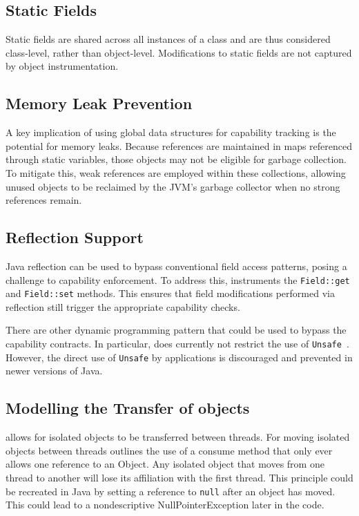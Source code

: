 \subsection{Static Fields}
Static fields are shared across all instances of a class and are thus considered class-level, rather than object-level. Modifications to static fields are not captured by \jdala object instrumentation. 

\subsection{Memory Leak Prevention}

A key implication of using global data structures for capability tracking is the potential for memory leaks. Because references are maintained in maps referenced through static variables, those objects may not be eligible for garbage collection. To mitigate this, weak references are employed within these collections, allowing unused objects to be reclaimed by the JVM's garbage collector when no strong references remain.


\subsection{Reflection Support}

Java reflection can be used to bypass conventional field access patterns, posing a challenge to capability enforcement. To address this, \jdala instruments the \texttt{Field::get} and \texttt{Field::set} methods. This ensures that field modifications performed via reflection still trigger the appropriate capability checks.

There are other dynamic programming pattern that could be used to bypass the capability contracts. In particular, \jdala does currently  not restrict the use of \texttt{Unsafe}~\cite{mastrangelo2015use}. However, the direct use of \texttt{Unsafe} by applications is discouraged and prevented in newer versions of Java.


\subsection{Modelling the Transfer of \Isolated objects}

\dala allows for isolated objects to be transferred between threads.
For moving isolated objects between threads \dala outlines the use of a consume method that only ever allows one reference to an Object. 
Any isolated object that moves from one thread to another will lose its affiliation with the first thread. This principle could be recreated in Java by setting a reference to \texttt{null} after an object has moved. This could lead to a nondescriptive NullPointerException later in the code.


